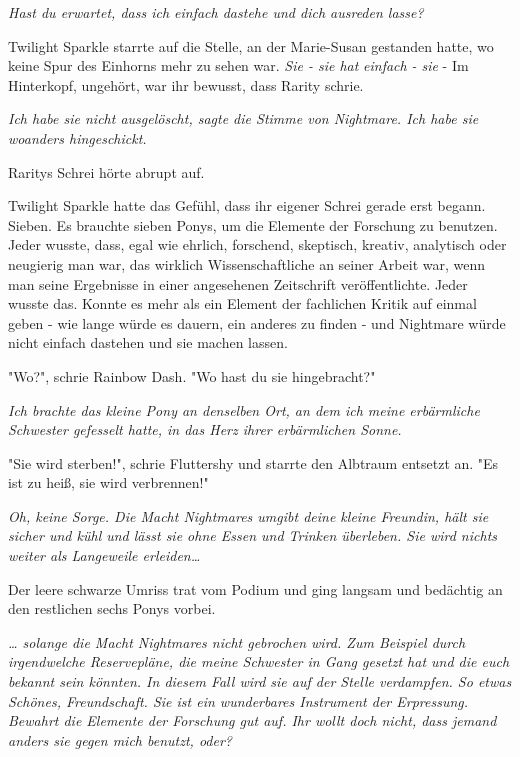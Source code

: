 {\emph{\emph{Hast du erwartet, dass ich einfach dastehe und dich ausreden lasse?}}

Twilight Sparkle starrte auf die Stelle, an der Marie-Susan gestanden hatte, wo keine Spur des Einhorns mehr zu sehen war. \emph{Sie - sie hat} \emph{einfach} \emph{- sie} - Im Hinterkopf, ungehört, war ihr bewusst, dass Rarity schrie.

\emph{\emph{Ich habe sie nicht ausgelöscht}, sagte die Stimme von Nightmare. \emph{Ich habe sie woanders hingeschickt.}}

Raritys Schrei hörte abrupt auf.

Twilight Sparkle hatte das Gefühl, dass ihr eigener Schrei gerade erst begann. Sieben. Es brauchte sieben Ponys, um die Elemente der Forschung zu benutzen. Jeder wusste, dass, egal wie ehrlich, forschend, skeptisch, kreativ, analytisch oder neugierig man war, das wirklich Wissenschaftliche an seiner Arbeit war, wenn man seine Ergebnisse in einer angesehenen Zeitschrift veröffentlichte. Jeder wusste das. Konnte es mehr als ein Element der fachlichen Kritik auf einmal geben - wie lange würde es dauern, ein anderes zu finden - und Nightmare würde nicht einfach dastehen und sie machen lassen.

"Wo?", schrie Rainbow Dash. "Wo hast du sie hingebracht?"

\emph{\emph{Ich brachte das kleine Pony an denselben Ort, an dem ich meine erbärmliche Schwester gefesselt hatte, in das Herz ihrer erbärmlichen Sonne.}}

"Sie wird sterben!", schrie Fluttershy und starrte den Albtraum entsetzt an. "Es ist zu heiß, sie wird verbrennen!"

\emph{\emph{Oh, keine Sorge. Die Macht} \emph{Nightmares} \emph{umgibt deine kleine Freundin, hält sie sicher und kühl und lässt sie ohne Essen und Trinken überleben. Sie wird nichts weiter als Langeweile erleiden…}}

Der leere schwarze Umriss trat vom Podium und ging langsam und bedächtig an den restlichen sechs Ponys vorbei.

\emph{\emph{… solange die Macht} \emph{Nightmares} \emph{nicht gebrochen wird. Zum Beispiel durch irgendwelche Reservepläne, die meine Schwester in Gang gesetzt hat und die euch bekannt sein könnten. In diesem Fall wird sie auf der Stelle verdampfen. So etwas Schönes, Freundschaft. Sie ist ein wunderbares Instrument der Erpressung. Bewahrt die Elemente der Forschung gut auf. Ihr wollt doch nicht, dass jemand anders sie gegen mich benutzt, oder?}}

}
